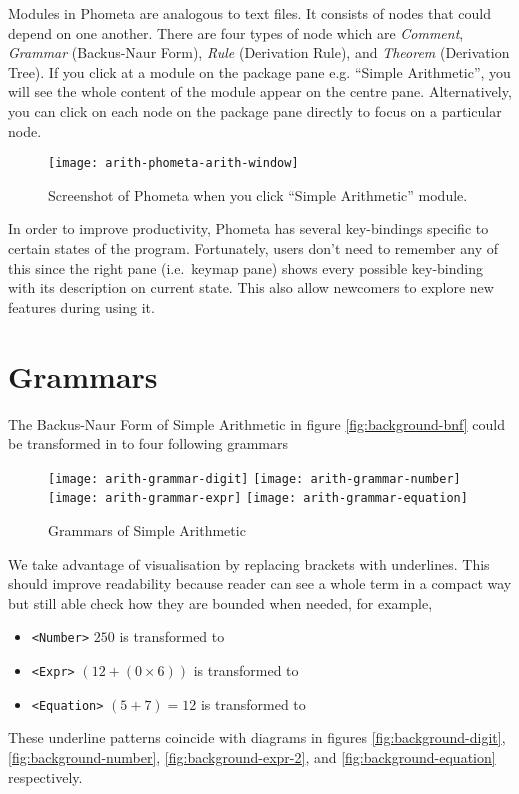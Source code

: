 \documentclass[master.tex]{subfiles}
\begin{document}
Modules in Phometa are analogous to text files. It consists of nodes that could
depend on one another. There are four types of node which are \emph{Comment},
\emph{Grammar} (Backus-Naur Form), \emph{Rule} (Derivation Rule), and
\emph{Theorem} (Derivation Tree). If you click at a module on the package
pane e.g. ``Simple Arithmetic'', you will see the whole content of the module
appear on the centre pane. Alternatively, you can click on each node on the
package pane directly to focus on a particular node.

\begin{figure}[H]
    \centering
    \texttt{[image: arith-phometa-arith-window]}
    \caption{Screenshot of Phometa when you click ``Simple Arithmetic'' module.}
\label{fig:arith-phometa-arith-window}
\end{figure}

In order to improve productivity, Phometa has several key-bindings specific to
certain states of the program. Fortunately, users don't need to remember any of
this since the right pane (i.e.\ keymap pane) shows every possible key-binding
with its description on current state. This also allow newcomers to explore new
features during using it.

\section{Grammars}

The Backus-Naur Form of Simple Arithmetic in figure \ref{fig:background-bnf}
could be transformed in to four following grammars
\begin{figure}[H]
    \centering
\begin{minipage}{0.7\textwidth}
    \texttt{[image: arith-grammar-digit]}
    \texttt{[image: arith-grammar-number]}
    \texttt{[image: arith-grammar-expr]}
    \texttt{[image: arith-grammar-equation]}
\end{minipage}

    \caption{Grammars of Simple Arithmetic}
\label{fig:arith-grammars}
\end{figure}

We take advantage of visualisation by replacing brackets with underlines. This
should improve readability because reader can see a whole term in a compact
way but still able check how they are bounded when needed, for example,
\begin{itemize}
\item \texttt{<Number>} $250$ is transformed to
   
\item \texttt{<Expr>} $(12 + (0 \times 6))$ is transformed to
   
\item \texttt{<Equation>} $(5 + 7) = 12$ is transformed to
   
\end{itemize}
These underline patterns coincide with diagrams in figures
\ref{fig:background-digit}, \ref{fig:background-number},
\ref{fig:background-expr-2}, and \ref{fig:background-equation} respectively.
\end{document}
